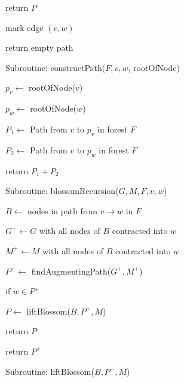 \documentclass{article}
\begin{document}
\hspace{5cm} return $P$

\hspace{3cm} mark edge $(v, w)$

\hspace{1cm} return empty path

\vspace{0.5cm}

Subroutine: constructPath($F, v, w$, rootOfNode) \dotfill

\hspace{1cm} $p_v \leftarrow$ rootOfNode($v$)

\hspace{1cm} $p_w \leftarrow$ rootOfNode($w$)

\hspace{1cm} $P_1 \leftarrow$ Path from $v$ to $p_v$ in forest $F$

\hspace{1cm} $P_2 \leftarrow$ Path from $v$ to $p_w$ in forest $F$

\hspace{1cm} return $P_1 + P_2$

\vspace{0.5cm}

Subroutine: blossomRecursion($G, M, F, v, w$) \dotfill

\hspace{1cm} $B \leftarrow$ nodes in path from $v \to w$ in $F$

\hspace{1cm} $G^+ \leftarrow G$ with all nodes of $B$ contracted into $w$

\hspace{1cm} $M^+ \leftarrow M$ with all nodes of $B$ contracted into $w$

\hspace{1cm} $P^+ \leftarrow$ findAugmentingPath($G^+, M^+$)

\hspace{1cm} if $w \in P^+$

\hspace{2cm} $P \leftarrow$ liftBlossom($B, P^+, M$)

\hspace{2cm} return $P$

\hspace{1cm} return $P^+$

\vspace{0.5cm}

Subroutine: liftBlossom($B, P^+, M$) \dotfill
\end{document}
